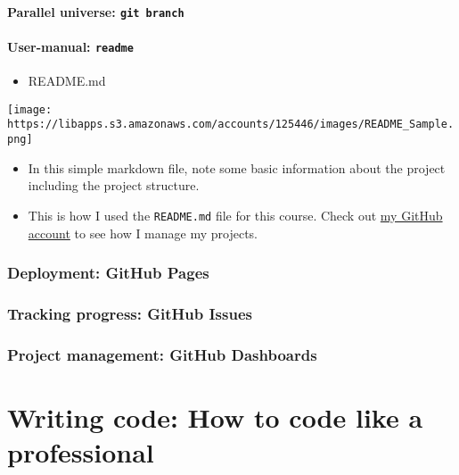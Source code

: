 \documentclass[
]{book}
\providecommand{\tightlist}{%
  \setlength{\itemsep}{0pt}\setlength{\parskip}{0pt}}
\begin{document}
\hypertarget{parallel-universe-git-branch}{%
\paragraph{\texorpdfstring{Parallel universe: \texttt{git\ branch}}{Parallel universe: git branch}}\label{parallel-universe-git-branch}}

\hypertarget{user-manual-readme}{%
\paragraph{\texorpdfstring{User-manual: \texttt{readme}}{User-manual: readme}}\label{user-manual-readme}}

\begin{itemize}
\tightlist
\item
  README.md
\end{itemize}

\texttt{[image: https://libapps.s3.amazonaws.com/accounts/125446/images/README\_Sample.png]}

\begin{itemize}
\item
  In this simple markdown file, note some basic information about the project including the project structure.
\item
  This is how I used the \texttt{README.md} file for this course. Check out \href{https://github.com/jaeyk}{my GitHub account} to see how I manage my projects.
\end{itemize}

\hypertarget{deployment-github-pages}{%
\subsubsection{Deployment: GitHub Pages}\label{deployment-github-pages}}

\hypertarget{tracking-progress-github-issues}{%
\subsubsection{Tracking progress: GitHub Issues}\label{tracking-progress-github-issues}}

\hypertarget{project-management-github-dashboards}{%
\subsubsection{Project management: GitHub Dashboards}\label{project-management-github-dashboards}}

\hypertarget{writing-code-how-to-code-like-a-professional}{%
\section{Writing code: How to code like a professional}\label{writing-code-how-to-code-like-a-professional}}
\end{document}
